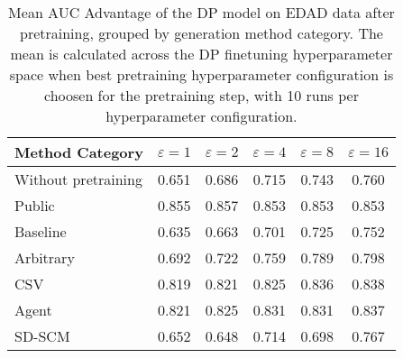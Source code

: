 \begin{table}[h!]
    \centering
    \caption{Mean AUC Advantage of the DP model on EDAD data after pretraining, grouped by generation method category. The mean is calculated across the DP finetuning hyperparameter space when best pretraining hyperparameter configuration is choosen for the pretraining step, with 10 runs per hyperparameter configuration.}
    \label{tab:epsilon_comparison}
    \begin{tabular}{lccccc}
    \toprule
    Method Category & $\varepsilon=1$ & $\varepsilon=2$ & $\varepsilon=4$ & $\varepsilon=8$ & $\varepsilon=16$ \\
    \midrule
    Without pretraining & 0.651 & 0.686 & 0.715 & 0.743 & 0.760 \\
    \arrayrulecolor{black!50!}\midrule
    Public & \cellcolor{gold!30}0.855 & \cellcolor{gold!30}0.857 & \cellcolor{gold!30}0.853 & \cellcolor{gold!30}0.853 & \cellcolor{gold!30}0.853 \\
    \arrayrulecolor{black!50!}\midrule
    Baseline & 0.635 & 0.663 & 0.701 & 0.725 & 0.752 \\
    \arrayrulecolor{black!50!}\midrule
    Arbitrary & 0.692 & 0.722 & 0.759 & 0.789 & 0.798 \\
    \arrayrulecolor{black!50!}\midrule
    CSV & \cellcolor{bronze!30}0.819 & \cellcolor{bronze!30}0.821 & \cellcolor{bronze!30}0.825 & \cellcolor{silver!30}0.836 & \cellcolor{silver!30}0.838 \\
    Agent & \cellcolor{silver!30}0.821 & \cellcolor{silver!30}0.825 & \cellcolor{silver!30}0.831 & \cellcolor{bronze!30}0.831 & \cellcolor{bronze!30}0.837 \\
    SD-SCM & 0.652 & 0.648 & 0.714 & 0.698 & 0.767 \\
    \bottomrule
    \end{tabular}
\end{table}